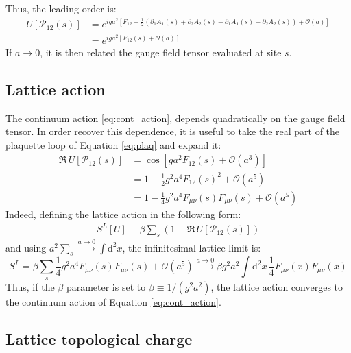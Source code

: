 Thus, the leading order is:
\begin{equation}\label{eq:plaq}
    \begin{aligned}
        U[\mathcal P_{12}(s)] &= e^{iga^2[F_{12} + \frac{1}{2}(\partial_1A_1(s) + \partial_2A_2(s) - \partial_1A_1(s) - \partial_2A_2(s)) %
                                   + \mathcal O\left(a\right)]} \\
                         &= e^{iga^2\left[F_{12}(s) + \mathcal O\left(a\right)\right]}
    \end{aligned}
\end{equation}
If $a \to 0$, it is then related the gauge field tensor evaluated at site $s$.

\subsection*{Lattice action}

The continuum action \eqref{eq:cont_action}, depends quadratically on the gauge field tensor.
In order recover this dependence, it is useful to take the real part of the plaquette loop of Equation \eqref{eq:plaq} and expand it:
\begin{align*}
    \Re\,U[\mathcal P_{12}(s)] &= \cos\left[ga^2F_{12}(s) + \mathcal O\left(a^3\right)\right] \\
                          &= 1 - \frac{1}{2}g^2a^4F_{12}(s)^2 + \mathcal O\left(a^5\right) \\
                          &= 1 - \frac{1}{4}g^2a^4F_{\mu\nu}(s)F_{\mu\nu}(s) + \mathcal O\left(a^5\right)
\end{align*}
Indeed, defining the lattice action in the following form:
\begin{equation}\label{eq:lat_action}
    \begin{aligned}
        S^L[U] \equiv \beta\sum_s\left(1-\Re\,U[\mathcal P_{12}(s)]\right)
    \end{aligned}
\end{equation}
and using $a^2\sum_s \xrightarrow{a\to0} \int\mathrm d^2x$, the infinitesimal lattice limit is:
\[
    S^L = \beta\sum_s\frac{1}{4}g^2a^4F_{\mu\nu}(s)F_{\mu\nu}(s) + \mathcal O\left(a^5\right)
      \xrightarrow{a\to0} \beta g^2a^2\int\mathrm d^2x\,\frac{1}{4}F_{\mu\nu}(x)F_{\mu\nu}(x)
\]
Thus, if the $\beta$ parameter is set to $\beta \equiv 1/(g^2a^2)$,
the lattice action converges to the continuum action of Equation \eqref{eq:cont_action}.

\subsection*{Lattice topological charge}


